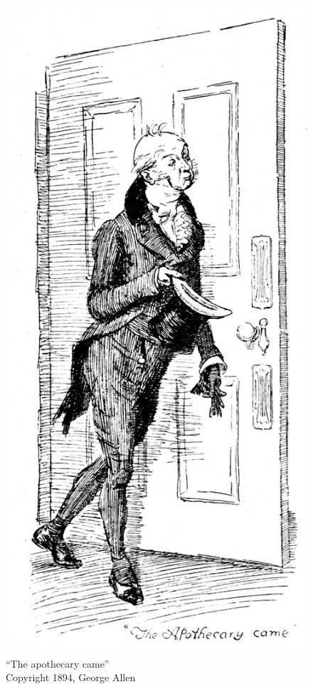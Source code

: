 \begin{figure}[htbp]
    \centering
    \includegraphics[width=\textwidth]{illustrations/i_073.jpg}
    \caption{“The apothecary came”\\ Copyright 1894, George Allen}
    \label{fig:image}
\end{figure}

